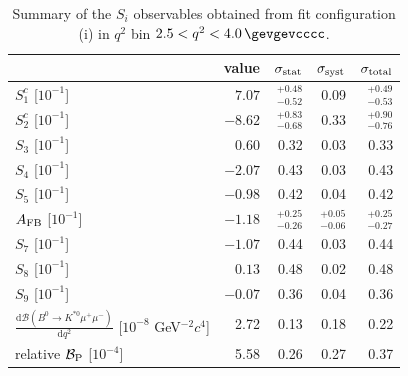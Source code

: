 \begin{table}\centering
\caption{Summary of the $S_{i}$ observables obtained from fit configuration (i) in $q^{2}$ bin \mbox{$2.5 < q^{2} < 4.0\,\gevgevcccc$}.}
\label{sec:fit_results:si_s1c:table:summary_bin2}
\begin{tabular}{lrrrr}
\toprule
 & value & $\sigma_{\rm stat}$ & $\sigma_{\rm syst}$ & $\sigma_{\rm total}$ \\
\midrule
$S_{1}^{c}$ [$ 10^{-1}$] & $7.07$ & $^{+0.48}_{-0.52}$ & 0.09 & $^{+0.49}_{-0.53}$ \\
$S_{2}^{c}$ [$ 10^{-1}$] & $-8.62$ & $^{+0.83}_{-0.68}$ & 0.33 & $^{+0.90}_{-0.76}$ \\
$S_{3}$ [$ 10^{-1}$] & $0.60$ & 0.32 & 0.03 & 0.33 \\
$S_{4}$ [$ 10^{-1}$] & $-2.07$ & 0.43 & 0.03 & 0.43 \\
$S_{5}$ [$ 10^{-1}$] & $-0.98$ & 0.42 & 0.04 & 0.42 \\
$A_{\rm FB}$ [$ 10^{-1}$] & $-1.18$ & $^{+0.25}_{-0.26}$ & $^{+0.05}_{-0.06}$ & $^{+0.25}_{-0.27}$ \\
$S_{7}$ [$ 10^{-1}$] & $-1.07$ & 0.44 & 0.03 & 0.44 \\
$S_{8}$ [$ 10^{-1}$] & $0.13$ & 0.48 & 0.02 & 0.48 \\
$S_{9}$ [$ 10^{-1}$] & $-0.07$ & 0.36 & 0.04 & 0.36 \\
\midrule
$\frac{\mathrm{d}\mathcal{B}(B^{0}\to K^{\ast 0}\mu^{+}\mu^{-})}{\mathrm{d} q^{2}}$ [$ 10^{-8}$ GeV$^{-2}c^{4}$] & 2.72 & 0.13 & 0.18 & 0.22 \\
relative $\mathcal{B}_{\rm P}$ [$10^{-4}$] & 5.58 & 0.26 & 0.27 & 0.37 \\
\bottomrule
\end{tabular}
\end{table}
